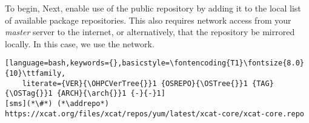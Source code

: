 To begin,
\else
Next, 
\fi
enable use of the public \xCAT{} repository by adding it to the local list
of available package repositories. This also requires network access from
your {\em master} server to the internet, or alternatively, that
the repository be mirrored locally. In this case, we use the network.

\begin{lstlisting}[language=bash,keywords={},basicstyle=\fontencoding{T1}\fontsize{8.0}{10}\ttfamily,
	literate={VER}{\OHPCVerTree{}}1 {OSREPO}{\OSTree{}}1 {TAG}{\OSTag{}}1 {ARCH}{\arch{}}1 {-}{-}1]
[sms](*\#*) (*\addrepo*) https://xcat.org/files/xcat/repos/yum/latest/xcat-core/xcat-core.repo
\end{lstlisting}

